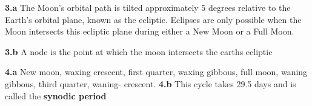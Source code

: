 \documentclass{report}
\begin{document}
    \pagebreak \bigbreak \noindent 
    \textbf{3.a} The Moon's orbital path is tilted approximately 5 degrees relative to the Earth's orbital plane, known as the ecliptic. Eclipses are only possible when the Moon intersects this ecliptic plane during either a New Moon or a Full Moon.

    \bigbreak \noindent 
    \textbf{3.b} A node is the point at which the moon intersects the earths ecliptic
    
    \bigbreak \noindent 
    \textbf{4.a}   New moon, waxing crescent, first quarter, waxing gibbous, full moon, waning gibbous, third quarter, waning- crescent.
    \bigbreak \noindent 
    \textbf{4.b} This cycle takes 29.5 days and is called the \textbf{synodic period}





    
\end{document}
